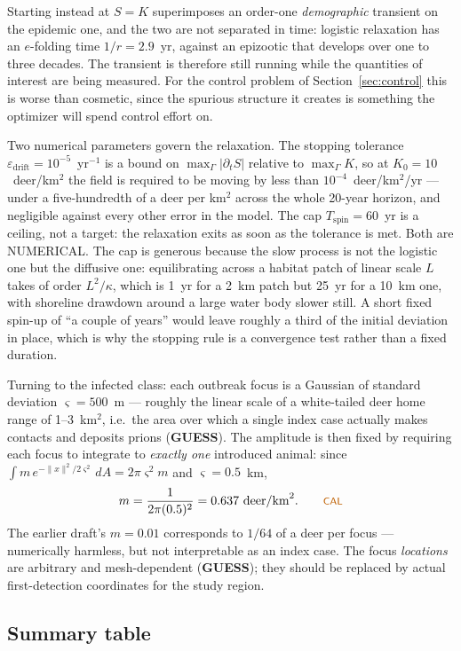 \documentclass[11pt]{article}
\newcommand{\tagCAL}{{\footnotesize\textsf{\textcolor{orange!75!black}{CAL}}}}
\newcommand{\tagGUESS}{{\footnotesize\textsf{\textbf{\textcolor{red!70!black}{GUESS}}}}}
\newcommand{\tagNUM}{{\footnotesize\textsf{\textcolor{purple!70!black}{NUMERICAL}}}}
\begin{document}
Starting instead at $S=K$ superimposes an order-one \emph{demographic} transient on the epidemic one, and the two are not separated in time: logistic relaxation has an $e$-folding time $1/r = 2.9$~yr, against an epizootic that develops over one to three decades. The transient is therefore still running while the quantities of interest are being measured. For the control problem of Section~\ref{sec:control} this is worse than cosmetic, since the spurious structure it creates is something the optimizer will spend control effort on.

Two numerical parameters govern the relaxation. The stopping tolerance $\varepsilon_{\text{drift}} = 10^{-5}$~yr$^{-1}$ is a bound on $\max_\Gamma|\partial_t S|$ relative to $\max_\Gamma K$, so at $K_0 = 10$~deer/km$^2$ the field is required to be moving by less than $10^{-4}$~deer/km$^2$/yr --- under a five-hundredth of a deer per km$^2$ across the whole 20-year horizon, and negligible against every other error in the model. The cap $T_{\text{spin}} = 60$~yr is a ceiling, not a target: the relaxation exits as soon as the tolerance is met. Both are \tagNUM{}. The cap is generous because the slow process is not the logistic one but the diffusive one: equilibrating across a habitat patch of linear scale $L$ takes of order $L^2/\kappa$, which is 1~yr for a 2~km patch but 25~yr for a 10~km one, with shoreline drawdown around a large water body slower still. A short fixed spin-up of ``a couple of years'' would leave roughly a third of the initial deviation in place, which is why the stopping rule is a convergence test rather than a fixed duration.

Turning to the infected class: each outbreak focus is a Gaussian of standard deviation $\varsigma = 500$~m --- roughly the linear scale of a white-tailed deer home range of 1--3~km$^2$, i.e.\ the area over which a single index case actually makes contacts and deposits prions (\tagGUESS{}). The amplitude is then fixed by requiring each focus to integrate to \emph{exactly one} introduced animal: since $\int m\,e^{-\lVert x\rVert^2/2\varsigma^2}\,dA = 2\pi\varsigma^2 m$ and $\varsigma = 0.5$~km,
\[
m = \frac{1}{2\pi(0.5)^2} = 0.637\ \text{deer/km}^2. \qquad \tagCAL{}
\]
The earlier draft's $m = 0.01$ corresponds to $1/64$ of a deer per focus --- numerically harmless, but not interpretable as an index case. The focus \emph{locations} are arbitrary and mesh-dependent (\tagGUESS{}); they should be replaced by actual first-detection coordinates for the study region.

\subsection{Summary table}
\end{document}
